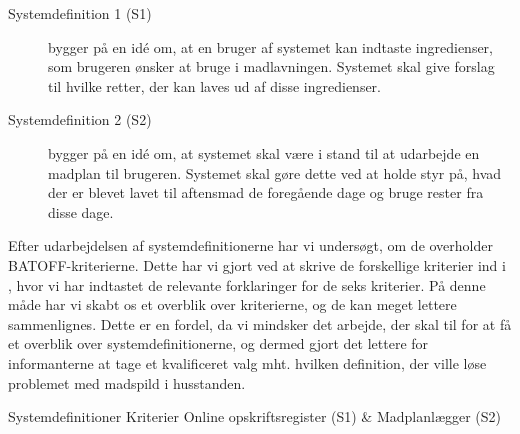 \begin{description}
\item[Systemdefinition 1 (S1)] bygger på en idé om, at en bruger af systemet kan indtaste ingredienser, som brugeren ønsker at bruge i madlavningen. Systemet skal give forslag til hvilke retter, der kan laves ud af disse ingredienser.
\item[Systemdefinition 2 (S2)] bygger på en idé om, at systemet skal være i stand til at udarbejde en madplan til brugeren. Systemet skal gøre dette ved at holde styr på, hvad der er blevet lavet til aftensmad de foregående dage og bruge rester fra disse dage.
\end{description}

Efter udarbejdelsen af systemdefinitionerne har vi undersøgt, om de overholder BATOFF-kriterierne. Dette har vi gjort ved at skrive de forskellige kriterier ind i , hvor vi har indtastet de relevante forklaringer for de seks kriterier. På denne måde har vi skabt os et overblik over kriterierne, og de kan meget lettere sammenlignes. Dette er en fordel, da vi mindsker det arbejde, der skal til for at få et overblik over systemdefinitionerne, og dermed gjort det lettere for informanterne at tage et kvalificeret valg mht. hvilken definition, der ville løse problemet med madspild i husstanden.

                                                 {Systemdefinitioner}
       {Kriterier        }{ Online opskriftsregister (S1) & Madplanlægger (S2)                   }{
}

